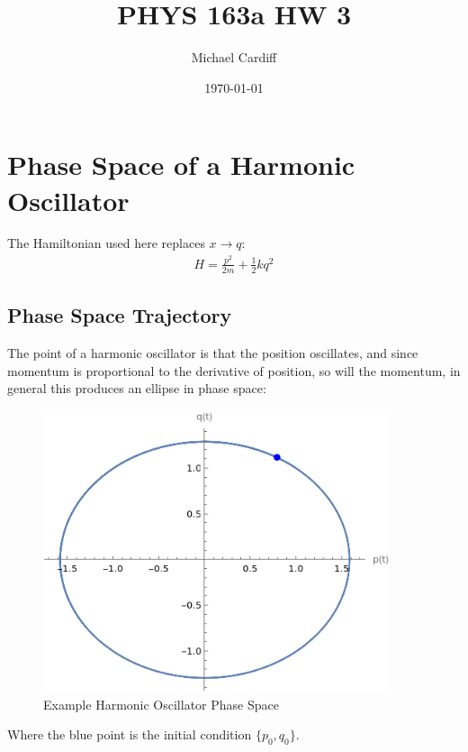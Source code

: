 \documentclass[12pt]{article}
\title{\vspace{-1em}PHYS 163a HW 3}
\author{Michael Cardiff}
\date{\today}
\begin{document}
\maketitle

\section{Phase Space of a Harmonic Oscillator}
The Hamiltonian used here replaces $x\to q$:
\begin{align*}
  H=\frac{p^2}{2m}+\frac12kq^2
\end{align*}
\subsection{Phase Space Trajectory}
The point of a harmonic oscillator is that the position oscillates, and since momentum is proportional to the derivative of position, so will the momentum, in general this produces an ellipse in phase space:
\begin{figure}[H]
  \centering
  \includegraphics[width=4.0in]{phase1.png}
  \caption{Example Harmonic Oscillator Phase Space}
\end{figure}
Where the blue point is the initial condition $\{p_0,q_0\}$.
\end{document}
